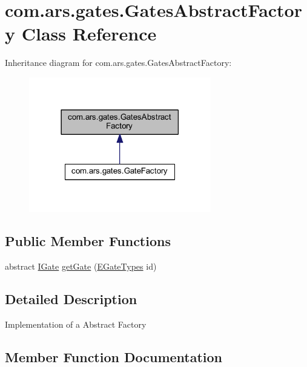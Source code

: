 \hypertarget{classcom_1_1ars_1_1gates_1_1_gates_abstract_factory}{}\section{com.\+ars.\+gates.\+Gates\+Abstract\+Factory Class Reference}
\label{classcom_1_1ars_1_1gates_1_1_gates_abstract_factory}


Inheritance diagram for com.\+ars.\+gates.\+Gates\+Abstract\+Factory\+:\nopagebreak
\begin{figure}[H]
\begin{center}
\leavevmode
\includegraphics[width=225pt]{classcom_1_1ars_1_1gates_1_1_gates_abstract_factory__inherit__graph}
\end{center}
\end{figure}
\subsection*{Public Member Functions}
\begin{DoxyCompactItemize}
\item 
abstract \hyperlink{interfacecom_1_1ars_1_1gates_1_1_i_gate}{I\+Gate} \hyperlink{classcom_1_1ars_1_1gates_1_1_gates_abstract_factory_a06a4a9da0a9fc741f70ce28b74156cab}{get\+Gate} (\hyperlink{enumcom_1_1ars_1_1gates_1_1_e_gate_types}{E\+Gate\+Types} id)
\end{DoxyCompactItemize}


\subsection{Detailed Description}
Implementation of a Abstract Factory 

\subsection{Member Function Documentation}
\hypertarget{classcom_1_1ars_1_1gates_1_1_gates_abstract_factory_a06a4a9da0a9fc741f70ce28b74156cab}{}\label{classcom_1_1ars_1_1gates_1_1_gates_abstract_factory_a06a4a9da0a9fc741f70ce28b74156cab} 
